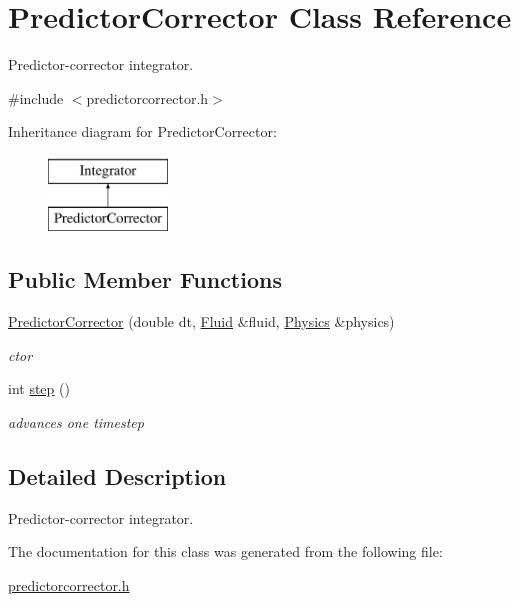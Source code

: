 \hypertarget{classPredictorCorrector}{\section{\-Predictor\-Corrector \-Class \-Reference}
\label{classPredictorCorrector}
}


\-Predictor-\/corrector integrator.  




{\ttfamily \#include $<$predictorcorrector.\-h$>$}

\-Inheritance diagram for \-Predictor\-Corrector\-:\begin{figure}[H]
\begin{center}
\leavevmode
\includegraphics[height=2.000000cm]{classPredictorCorrector}
\end{center}
\end{figure}
\subsection*{\-Public \-Member \-Functions}
\begin{DoxyCompactItemize}
\item 
\hypertarget{classPredictorCorrector_ad39d1bbacf7a674d630a44ec67c6e2c0}{\hyperlink{classPredictorCorrector_ad39d1bbacf7a674d630a44ec67c6e2c0}{\-Predictor\-Corrector} (double dt, \hyperlink{classFluid}{\-Fluid} \&fluid, \hyperlink{classPhysics}{\-Physics} \&physics)}\label{classPredictorCorrector_ad39d1bbacf7a674d630a44ec67c6e2c0}

\begin{DoxyCompactList}\small\item\em ctor \end{DoxyCompactList}\item 
\hypertarget{classPredictorCorrector_aec41b3501a2d94a04e74395f9877ad6f}{int \hyperlink{classPredictorCorrector_aec41b3501a2d94a04e74395f9877ad6f}{step} ()}\label{classPredictorCorrector_aec41b3501a2d94a04e74395f9877ad6f}

\begin{DoxyCompactList}\small\item\em advances one timestep \end{DoxyCompactList}\end{DoxyCompactItemize}


\subsection{\-Detailed \-Description}
\-Predictor-\/corrector integrator. 

\-The documentation for this class was generated from the following file\-:\begin{DoxyCompactItemize}
\item 
\hyperlink{predictorcorrector_8h}{predictorcorrector.\-h}\end{DoxyCompactItemize}
